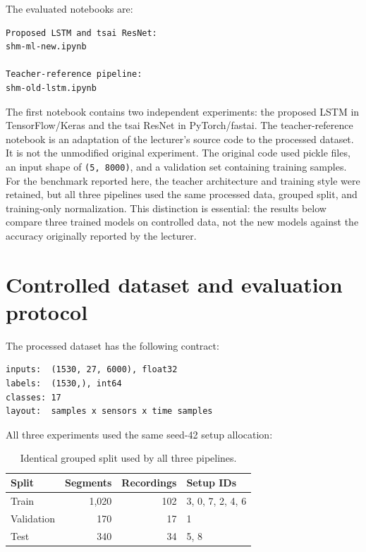 \documentclass[11pt,a4paper]{article}
\begin{document}
The evaluated notebooks are:

\begin{lstlisting}
Proposed LSTM and tsai ResNet:
shm-ml-new.ipynb

Teacher-reference pipeline:
shm-old-lstm.ipynb
\end{lstlisting}

The first notebook contains two independent experiments: the proposed LSTM in
TensorFlow/Keras and the tsai ResNet in PyTorch/fastai. The teacher-reference
notebook is an adaptation of the lecturer's source code
to the processed dataset. It is not the unmodified original experiment. The
original code used pickle files, an input shape of \texttt{(5, 8000)}, and a
validation set containing training samples. For the benchmark reported here,
the teacher architecture and training style were retained, but all three pipelines
used the same processed data, grouped split, and training-only normalization.
This distinction is essential: the results below compare three trained models
on controlled data, not the new models against the accuracy originally reported
by the lecturer.

\section{Controlled dataset and evaluation protocol}

The processed dataset has the following contract:

\begin{lstlisting}
inputs:  (1530, 27, 6000), float32
labels:  (1530,), int64
classes: 17
layout:  samples x sensors x time samples
\end{lstlisting}

All three experiments used the same seed-42 setup allocation:

\begin{table}[htbp]
\centering
\caption{Identical grouped split used by all three pipelines.}
\begin{tabular}{@{}lrrl@{}}
\toprule
\textbf{Split} & \textbf{Segments} & \textbf{Recordings} & \textbf{Setup IDs} \\
\midrule
Train      & 1,020 & 102 & 3, 0, 7, 2, 4, 6 \\
Validation &   170 &  17 & 1 \\
Test       &   340 &  34 & 5, 8 \\
\bottomrule
\end{tabular}
\end{table}
\end{document}
